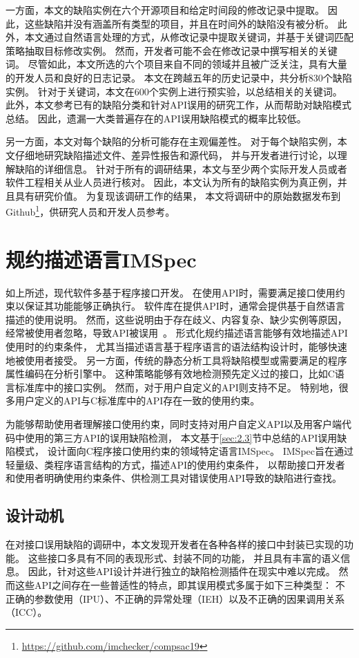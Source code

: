 一方面，本文的缺陷实例在六个开源项目和给定时间段的修改记录中提取。
因此，这些缺陷并没有涵盖所有类型的项目，并且在时间外的缺陷没有被分析。
此外，本文通过自然语言处理的方式，从修改记录中提取关键词，并基于关键词匹配策略抽取目标修改实例。
然而，开发者可能不会在修改记录中撰写相关的关键词。
尽管如此，本文所选的六个项目来自不同的领域并且被广泛关注，具有大量的开发人员和良好的日志记录。
本文在跨越五年的历史记录中，共分析830个缺陷实例。
针对于关键词，本文在600个实例上进行预实验，以总结相关的关键词。
此外，本文参考已有的缺陷分类和针对API误用的研究工作，从而帮助对缺陷模式总结。
因此，遗漏一大类普遍存在的API误用缺陷模式的概率比较低。

另一方面，本文对每个缺陷的分析可能存在主观偏差性。
对于每个缺陷实例，本文仔细地研究缺陷描述文件、差异性报告和源代码，
并与开发者进行讨论，以理解缺陷的详细信息。
针对于所有的调研结果，本文与至少两个实际开发人员或者软件工程相关从业人员进行核对。
因此，本文认为所有的缺陷实例为真正例，并且具有研究价值。
为复现该调研工作的结果，
本文将调研中的原始数据发布到Github\footnote{\url{https://github.com/imchecker/compsac19}}，供研究人员和开发人员参考。

\section{规约描述语言IMSpec}
\label{sec:2.4}
如上所述，现代软件多基于程序接口开发。
在使用API时，需要满足接口使用约束以保证其功能能够正确执行。
软件库在提供API时，通常会提供基于自然语言描述的使用说明。
然而，这些说明由于存在歧义、内容复杂、缺少实例等原因，经常被使用者忽略，导致API被误用~\cite{11-etaps-doc}。
形式化规约描述语言能够有效地描述API使用时的约束条件，
尤其当描述语言基于程序语言的语法结构设计时，能够快速地被使用者接受。
另一方面，传统的静态分析工具将缺陷模型或需要满足的程序属性编码在分析引擎中。
这种策略能够有效地检测预先定义过的接口，比如C语言标准库中的接口实例。
然而，对于用户自定义的API则支持不足。
特别地，很多用户定义的API与C标准库中的API存在一致的使用约束。

为能够帮助使用者理解接口使用约束，同时支持对用户自定义API以及用客户端代码中使用的第三方API的误用缺陷检测，
本文基于\ref{sec:2.3}节中总结的API误用缺陷模式，
设计面向C程序接口使用约束的领域特定语言IMSpec。
IMSpec旨在通过轻量级、类程序语言结构的方式，描述API的使用约束条件，
以帮助接口开发者和使用者明确使用约束条件、供检测工具对错误使用API导致的缺陷进行查找。

\subsection{设计动机}
在对接口误用缺陷的调研中，本文发现开发者在各种各样的接口中封装已实现的功能。
这些接口多具有不同的表现形式、封装不同的功能，
并且具有丰富的语义信息。
因此，针对这些API设计并进行独立的缺陷检测插件在现实中难以完成。
然而这些API之间存在一些普适性的特点，即其误用模式多属于如下三种类型：
不正确的参数使用（IPU）、不正确的异常处理（IEH）以及不正确的因果调用关系（ICC）。

